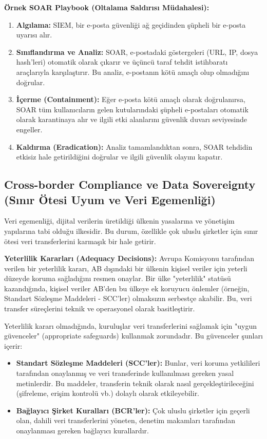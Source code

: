 \textbf{Örnek SOAR Playbook (Oltalama Saldırısı Müdahalesi):}
\begin{enumerate}
    \item \textbf{Algılama:} SIEM, bir e-posta güvenliği ağ geçidinden şüpheli bir e-posta uyarısı alır.
    \item \textbf{Sınıflandırma ve Analiz:} SOAR, e-postadaki göstergeleri (URL, IP, dosya hash'leri) otomatik olarak çıkarır ve üçüncü taraf tehdit istihbaratı araçlarıyla karşılaştırır. Bu analiz, e-postanın kötü amaçlı olup olmadığını doğrular.
    \item \textbf{İçerme (Containment):} Eğer e-posta kötü amaçlı olarak doğrulanırsa, SOAR tüm kullanıcıların gelen kutularındaki şüpheli e-postaları otomatik olarak karantinaya alır ve ilgili etki alanlarını güvenlik duvarı seviyesinde engeller.
    \item \textbf{Kaldırma (Eradication):} Analiz tamamlandıktan sonra, SOAR tehdidin etkisiz hale getirildiğini doğrular ve ilgili güvenlik olayını kapatır.
\end{enumerate}

\subsection{Cross-border Compliance ve Data Sovereignty (Sınır Ötesi Uyum ve Veri Egemenliği)}

Veri egemenliği, dijital verilerin üretildiği ülkenin yasalarına ve yönetişim yapılarına tabi olduğu ilkesidir. Bu durum, özellikle çok uluslu şirketler için sınır ötesi veri transferlerini karmaşık bir hale getirir.

\textbf{Yeterlilik Kararları (Adequacy Decisions):} Avrupa Komisyonu tarafından verilen bir yeterlilik kararı, AB dışındaki bir ülkenin kişisel veriler için yeterli düzeyde koruma sağladığını resmen onaylar. Bir ülke "yeterlilik" statüsü kazandığında, kişisel veriler AB'den bu ülkeye ek koruyucu önlemler (örneğin, Standart Sözleşme Maddeleri - SCC'ler) olmaksızın serbestçe akabilir. Bu, veri transfer süreçlerini teknik ve operasyonel olarak basitleştirir.

Yeterlilik kararı olmadığında, kuruluşlar veri transferlerini sağlamak için "uygun güvenceler" (appropriate safeguards) kullanmak zorundadır. Bu güvenceler şunları içerir:
\begin{itemize}
    \item \textbf{Standart Sözleşme Maddeleri (SCC'ler):} Bunlar, veri koruma yetkilileri tarafından onaylanmış ve veri transferinde kullanılması gereken yasal metinlerdir. Bu maddeler, transferin teknik olarak nasıl gerçekleştirileceğini (şifreleme, erişim kontrolü vb.) dolaylı olarak etkileyebilir.
    \item \textbf{Bağlayıcı Şirket Kuralları (BCR'ler):} Çok uluslu şirketler için geçerli olan, dahili veri transferlerini yöneten, denetim makamları tarafından onaylanması gereken bağlayıcı kurallardır.
\end{itemize}

